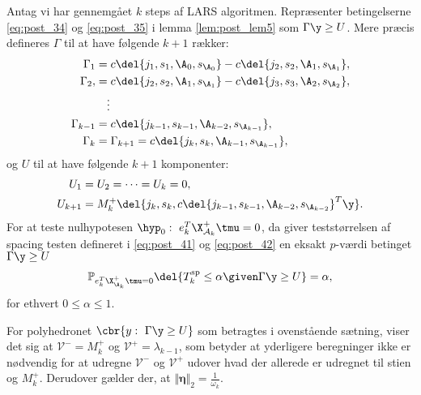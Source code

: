 %
\begin{thm} \label{thm:sp_test}
Antag vi har gennemgået \(k\) steps af LARS algoritmen.
Repræsenter betingelserne \eqref{eq:post_34} og \eqref{eq:post_35} i lemma \ref{lem:post_lem5} som \(\Gamma \y \geq U\).
Mere præcis defineres \(\Gamma\) til at have følgende \(k + 1 \) rækker:
\begin{align*}
\Gamma_1 &= c \del{j_1, s_1, \A_0, s_{\A_0}} - c \del{j_2, s_2, \A_1, s_{\A_1}}, \\
\Gamma_2, &= c \del{j_2, s_2, \A_1, s_{\A_1}} - c \del{j_3, s_3, \A_2, s_{\A_2}}, \\
& \quad \vdots \\
\Gamma_{k-1} &= c \del{j_{k-1}, s_{k-1}, \A_{k-2}, s_{\A_{k-1}}}, \\
 \Gamma_k &= \Gamma_{k+1} = c \del{j_k, s_k, \A_{k-1}, s_{\A_{k-1}}},
\end{align*}
og \(U\) til at have følgende \(k+1\) komponenter:
\begin{align*}
U_1 &= U_2 = \dots = U_k = 0, \\
U_{k+1} &= M_k^+ \del{j_k, s_k, c \del{j_{k-1}, s _{k-1}, \A_{k-2}, s_{\A_{k-2}}}^T \y}.
\end{align*}
For at teste nulhypotesen \(\hyp_0: \ e_k^T \X_{\mathcal{A}_k}^+ \tmu = 0\), da giver teststørrelsen af spacing testen defineret i \eqref{eq:post_41} og \eqref{eq:post_42} en eksakt \(p\)-værdi betinget \(\Gamma \y \geq U\)
\begin{align*}
\mathbb{P}_{e_k^T \X_{\A_k}^+ \tmu = 0} \del{T_k^\text{sp} \leq \alpha \given \Gamma \y \geq U} = \alpha,
\end{align*}
for ethvert \(0 \leq \alpha \leq 1\).
\end{thm}
%
For polyhedronet \(\cbr{y: \ \Gamma \y \geq U}\) som betragtes i ovenstående sætning, viser det sig at \(\mathcal{V}^- = M_k^+\) og \(\mathcal{V}^+=\lambda_{k-1}\), som betyder at yderligere beregninger ikke er nødvendig for at udregne \(\mathcal{V}^-\) og \(\mathcal{V}^+\) udover hvad der allerede er udregnet til stien og \(M_k^+\).
Derudover gælder der, at \(\Vert \boldsymbol{\eta} \Vert_2 = \frac{1}{\omega_k}\).

